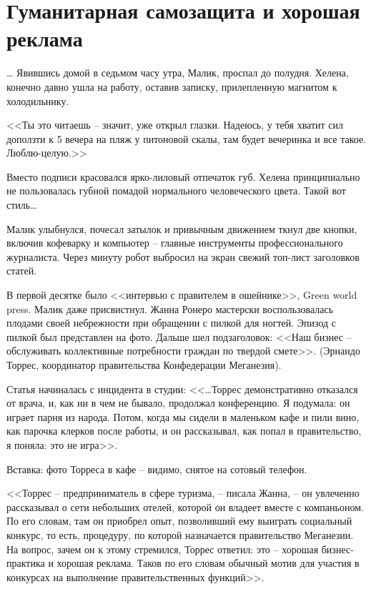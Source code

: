 \chapter{Гуманитарная самозащита и хорошая реклама}


\ldots{} Явившись домой в седьмом часу утра, Малик, проспал до полудня. Хелена, конечно давно ушла на работу, оставив записку, прилепленную магнитом к холодильнику.

<<Ты это читаешь -- значит, уже открыл глазки. Надеюсь, у тебя хватит сил доползти к 5 вечера на пляж у питоновой скалы, там будет вечеринка и все такое. Люблю-целую.>>

Вместо подписи красовался ярко-лиловый отпечаток губ. Хелена принципиально не пользовалась губной помадой нормального человеческого цвета. Такой вот стиль\ldots{}

Малик улыбнулся, почесал затылок и привычным движением ткнул две кнопки, включив кофеварку и компьютер -- главные инструменты профессионального журналиста. Через минуту робот выбросил на экран свежий топ-лист заголовков статей.

В первой десятке было <<интервью с правителем в ошейнике>>, Green world press. Малик даже присвистнул. Жанна Ронеро мастерски воспользовалась плодами своей небрежности при обращении с пилкой для ногтей. Эпизод с пилкой был представлен на фото. Дальше шел подзаголовок: <<Наш бизнес -- обслуживать коллективные потребности граждан по твердой смете>>. (Эрнандо Торрес, координатор правительства Конфедерации Меганезия).


Статья начиналась с инцидента в студии: <<\ldots{}Торрес демонстративно отказался от врача, и, как ни в чем не бывало, продолжал конференцию. Я подумала: он играет парня из народа. Потом, когда мы сидели в маленьком кафе и пили вино, как парочка клерков после работы, и он рассказывал, как попал в правительство, я поняла: это не игра>>.

Вставка: фото Торреса в кафе -- видимо, снятое на сотовый телефон.

<<Торрес -- предприниматель в сфере туризма, -- писала Жанна, -- он увлеченно рассказывал о сети небольших отелей, которой он владеет вместе с компаньоном. По его словам, там он приобрел опыт, позволивший ему выиграть социальный конкурс, то есть, процедуру, по которой назначается правительство Меганезии. На вопрос, зачем он к этому стремился, Торрес ответил: это -- хорошая бизнес-практика и хорошая реклама. Таков по его словам обычный мотив для участия в конкурсах на выполнение правительственных функций>>.

